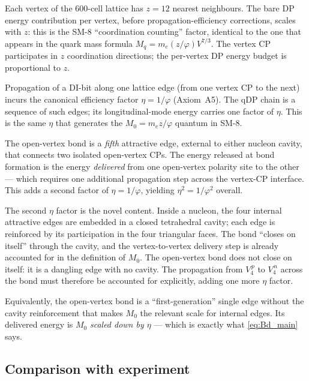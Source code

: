 \documentclass[11pt,letterpaper]{article}
\newcommand{\phig}{\varphi}
\newcommand{\Mzero}{M_0}
\begin{document}
\begin{description}[style=unboxed,leftmargin=1em]
\item[Coordination $z$.] Each vertex of the 600-cell lattice has $z = 12$ nearest neighbours. The bare DP energy contribution per vertex, before propagation-efficiency corrections, scales with $z$: this is the SM-8 ``coordination counting'' factor, identical to the one that appears in the quark mass formula $M_q = m_e (z/\phig) V^{7/3}$. The vertex CP participates in $z$ coordination directions; the per-vertex DP energy budget is proportional to $z$.
\item[DP--chain propagation, $1/\phig$.] Propagation of a DI-bit along one lattice edge (from one vertex CP to the next) incurs the canonical efficiency factor $\eta = 1/\phig$ (Axiom~A5). The qDP chain is a sequence of such edges; its longitudinal-mode energy carries one factor of $\eta$. This is the same $\eta$ that generates the $M_0 = m_e z/\phig$ quantum in SM-8.
\item[Bond-delivery propagation, $1/\phig$.] The open-vertex bond is a \emph{fifth} attractive edge, external to either nucleon cavity, that connects two isolated open-vertex CPs. The energy released at bond formation is the energy \emph{delivered} from one open-vertex polarity site to the other --- which requires one additional propagation step across the vertex-CP interface. This adds a second factor of $\eta = 1/\phig$, yielding $\eta^2 = 1/\phig^2$ overall.
\end{description}

The second $\eta$ factor is the novel content. Inside a nucleon, the four internal attractive edges are embedded in a closed tetrahedral cavity; each edge is reinforced by its participation in the four triangular faces. The bond ``closes on itself'' through the cavity, and the vertex-to-vertex delivery step is already accounted for in the definition of $\Mzero$. The open-vertex bond does not close on itself: it is a dangling edge with no cavity. The propagation from $V_4^{\,p}$ to $V_4^{\,n}$ across the bond must therefore be accounted for explicitly, adding one more $\eta$ factor.

Equivalently, the open-vertex bond is a ``first-generation'' single edge without the cavity reinforcement that makes $\Mzero$ the relevant scale for internal edges. Its delivered energy is $\Mzero$ \emph{scaled down by $\eta$} --- which is exactly what \eqref{eq:Bd_main} says.

\subsection{Comparison with experiment}
\end{document}
